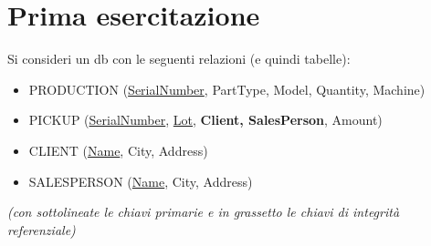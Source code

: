 \documentclass[a4paper,12pt, oneside]{book}
\begin{document}
\section{Prima esercitazione}
\begin{esercizio}
  Si consideri un db con le seguenti relazioni (e quindi tabelle):
  \begin{itemize}
    \item PRODUCTION (\underline{SerialNumber}, PartType, Model, Quantity,
    Machine) 
    \item PICKUP (\underline{SerialNumber}, \underline{Lot}, \textbf{Client,
      SalesPerson},  Amount) 
    \item CLIENT (\underline{Name}, City, Address)
    \item SALESPERSON (\underline{Name}, City, Address)
  \end{itemize}
  \textit{(con sottolineate le chiavi primarie e in grassetto le chiavi di
    integrità referenziale)}\\
  

\end{esercizio}
\end{document}
